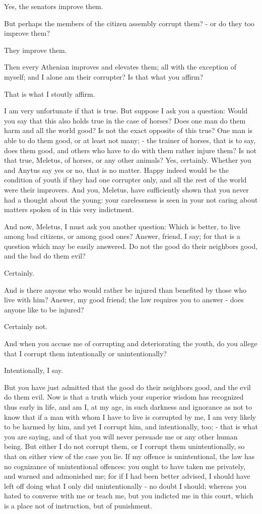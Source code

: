 \documentclass[11pt]{article}
\begin{document}
Yes, the senators improve them.

But perhaps the members of the citizen assembly corrupt them? - or do they too improve them?

They improve them.

Then every Athenian improves and elevates them; all with the exception of myself; and I alone am their corrupter? Is that what you affirm?

That is what I stoutly affirm.

I am very unfortunate if that is true. But suppose I ask you a question: Would you say that this also holds true in the case of horses? Does one man do them harm and all the world good? Is not the exact opposite of this true? One man is able to do them good, or at least not many; - the trainer of horses, that is to say, does them good, and others who have to do with them rather injure them? Is not that true, Meletus, of horses, or any other animals? Yes, certainly. Whether you and Anytus say yes or no, that is no matter. Happy indeed would be the condition of youth if they had one corrupter only, and all the rest of the world were their improvers. And you, Meletus, have sufficiently shown that you never had a thought about the young: your carelessness is seen in your not caring about matters spoken of in this very indictment.

And now, Meletus, I must ask you another question: Which is better, to live among bad citizens, or among good ones? Answer, friend, I say; for that is a question which may be easily answered. Do not the good do their neighbors good, and the bad do them evil?

Certainly.

And is there anyone who would rather be injured than benefited by those who live with him? Answer, my good friend; the law requires you to answer - does anyone like to be injured?

Certainly not.

And when you accuse me of corrupting and deteriorating the youth, do you allege that I corrupt them intentionally or unintentionally?

Intentionally, I say.

But you have just admitted that the good do their neighbors good, and the evil do them evil. Now is that a truth which your superior wisdom has recognized thus early in life, and am I, at my age, in such darkness and ignorance as not to know that if a man with whom I have to live is corrupted by me, I am very likely to be harmed by him, and yet I corrupt him, and intentionally, too; - that is what you are saying, and of that you will never persuade me or any other human being. But either I do not corrupt them, or I corrupt them unintentionally, so that on either view of the case you lie. If my offence is unintentional, the law has no cognizance of unintentional offences: you ought to have taken me privately, and warned and admonished me; for if I had been better advised, I should have left off doing what I only did unintentionally - no doubt I should; whereas you hated to converse with me or teach me, but you indicted me in this court, which is a place not of instruction, but of punishment.
\end{document}
